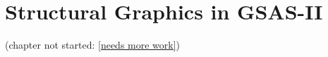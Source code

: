 \chapter{Structural Graphics in GSAS-II}\label{Chap:structureplotting}

(chapter not started: \ref{needs more work})